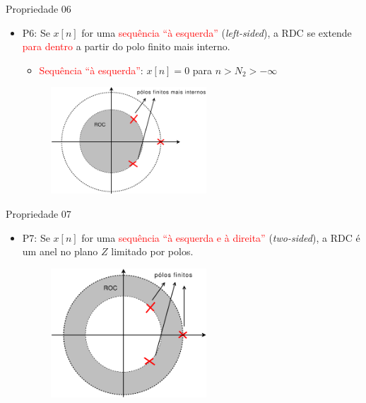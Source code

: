 \begin{slide}{Propriedade 06}
\begin{itemize}
   \item P6: Se $x[n]$ for uma \textcolor{red}{sequência ``à esquerda''} (\emph{left-sided}), a RDC se extende \textcolor{red}{para dentro} a partir do polo finito mais interno.
   \begin{itemize}
      \item \textcolor{red}{Sequência ``à esquerda''}: $x[n]=0$ para $n>N_2>-\infty $
   \end{itemize}
   \begin{figure}
      \centering
      \includegraphics[width=0.55\textwidth]{figs/p6.eps}
   \end{figure}
\end{itemize}
\end{slide}

\begin{slide}{Propriedade 07}
\begin{itemize}
   \item P7: Se $x[n]$ for uma \textcolor{red}{sequência ``à esquerda e à direita''} (\emph{two-sided}), a RDC é um anel no plano $Z$ limitado por polos.
   \begin{figure}
      \centering
      \includegraphics[width=0.55\textwidth]{figs/p7.eps}
   \end{figure}
\end{itemize}
\end{slide}

